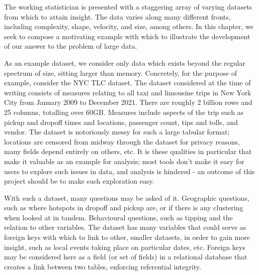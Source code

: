 The working statistician is presented with a staggering array of varying datasets from which to attain insight.
The data varies along many different fronts, including complexity, shape, velocity, and size, among others.
In this chapter, we seek to compose a motivating example with which to illustrate the development of our answer to the problem of large data.

As an example dataset, we consider only data which exists beyond the regular spectrum of size, sitting larger than memory.
Concretely, for the purpose of example, consider the NYC TLC dataset\cite{tlc2021trips}.
The dataset considered at the time of writing consists of measures relating to all taxi and limousine trips in New York City from January 2009 to December 2021.
There are roughly 2 billion rows and 25 columns, totalling over 60GB.
Measures include aspects of the trip such as pickup and dropoff times and locations, passenger count, tips and tolls, and vendor.
The dataset is notoriously messy for such a large tabular format; locations are censored from midway through the dataset for privacy reasons, many fields depend entirely on others, etc. It is these qualities in particular that make it valuable as an example for analysis; most tools don't make it easy for users to explore such issues in data, and analysis is hindered - an outcome of this project should be to make such exploration easy.

With such a dataset, many questions may be asked of it.
Geographic questions, such as where hotspots in dropoff and pickup are, or if there is any clustering when looked at in tandem.
Behavioural questions, such as tipping and the relation to other variables.
The dataset has many variables that could serve as foreign keys with which to link to other, smaller datasets, in order to gain more insight, such as local events taking place on particular dates, etc.
Foreign keys may be considered here as a field (or set of fields) in a relational database that creates a link between two tables, enforcing referential integrity.

